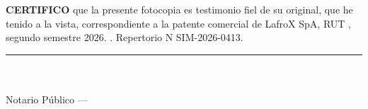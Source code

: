\documentclass[11pt]{article}
\begin{document}
\vspace{2pt}

\vspace{3pt}
{\SIMserif\selectfont\textbf{CERTIFICO} que la presente fotocopia es testimonio fiel de su original, que he tenido a la vista, correspondiente a la patente comercial de LafroX SpA, RUT \LFXrut, segundo semestre 2026. \SIMfecha. Repertorio N\textdegree{} SIM-2026-0413.\par}
\vspace{2pt}
\noindent\begin{minipage}[b]{0.4\linewidth}\SIMtimbrenotarial[2.2cm]\end{minipage}\hfill
\begin{minipage}[b]{0.5\linewidth}\centering\rule{6cm}{0.5pt}\\\SIMnotarioTitular\\Notario Público --- \SIMnotaria\end{minipage}

\end{document}
